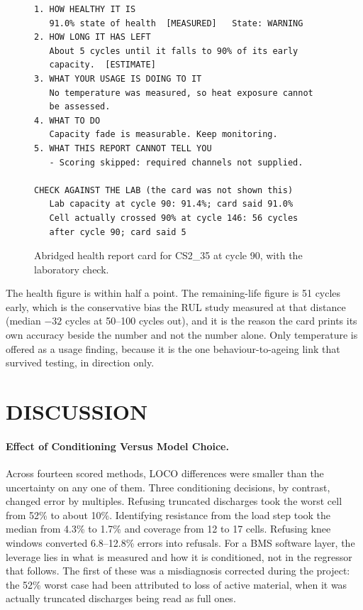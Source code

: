 \documentclass[12pt,a4paper]{amritareport}
\begin{document}
\begin{figure}[htbp]
    \centering
    {\footnotesize
\begin{verbatim}
1. HOW HEALTHY IT IS
   91.0% state of health  [MEASURED]   State: WARNING
2. HOW LONG IT HAS LEFT
   About 5 cycles until it falls to 90% of its early
   capacity.  [ESTIMATE]
3. WHAT YOUR USAGE IS DOING TO IT
   No temperature was measured, so heat exposure cannot
   be assessed.
4. WHAT TO DO
   Capacity fade is measurable. Keep monitoring.
5. WHAT THIS REPORT CANNOT TELL YOU
   - Scoring skipped: required channels not supplied.

CHECK AGAINST THE LAB (the card was not shown this)
   Lab capacity at cycle 90: 91.4%; card said 91.0%
   Cell actually crossed 90% at cycle 146: 56 cycles
   after cycle 90; card said 5
\end{verbatim}}
    \caption{Abridged health report card for CS2\_35 at cycle 90, with the laboratory check.}
    \label{fig:card}
\end{figure}

The health figure is within half a point. The remaining-life figure is 51 cycles early, which is the conservative bias the RUL study measured at that distance (median $-32$ cycles at 50--100 cycles out), and it is the reason the card prints its own accuracy beside the number and not the number alone. Only temperature is offered as a usage finding, because it is the one behaviour-to-ageing link that survived testing, in direction only.

\section{DISCUSSION}
\label{sec:discussion}

\paragraph{Effect of Conditioning Versus Model Choice.} Across fourteen scored methods, LOCO differences were smaller than the uncertainty on any one of them. Three conditioning decisions, by contrast, changed error by multiples. Refusing truncated discharges took the worst cell from 52\% to about 10\%. Identifying resistance from the load step took the median from 4.3\% to 1.7\% and coverage from 12 to 17 cells. Refusing knee windows converted 6.8--12.8\% errors into refusals. For a BMS software layer, the leverage lies in what is measured and how it is conditioned, not in the regressor that follows. The first of these was a misdiagnosis corrected during the project: the 52\% worst case had been attributed to loss of active material, when it was actually truncated discharges being read as full ones.
\end{document}
